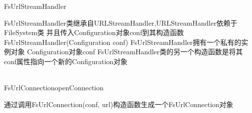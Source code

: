 \begin{XeClass}{FsUrlStreamHandler}
   
 FsUrlStreamHandler类继承自URLStreamHandler,URLStreamHandler依赖于FileSystem类
 并且传入Configuration对象conf到其构造函数FsUrlStreamHandler(Configuration conf)
 FsUrlStreamHandler拥有一个私有的实例对象 Configuration对象conf
 FsUrlStreamHandler类的另一个构造函数是将其conf属性指向一个新的Configuration对象

  \begin{XeMethod}{\XeProtected\\ }{FsUrlConnection}{openConnection}
       
 通过调用FsUrlConnection(conf, url)构造函数生成一个FsUrlConnection对象

  \end{XeMethod}

\end{XeClass}
